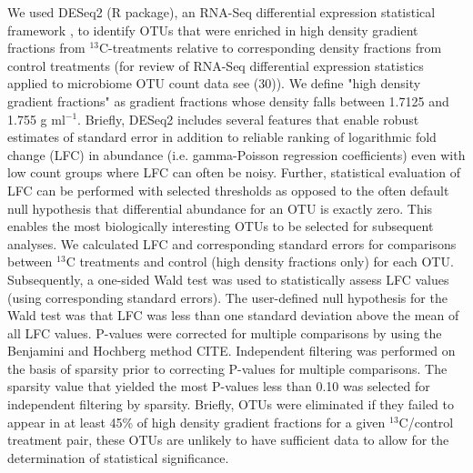 We used DESeq2 (R package), an RNA-Seq differential expression statistical
framework \citep{love2014}, to identify OTUs that were enriched in high
density gradient fractions from $^{13}$C-treatments relative to corresponding
density fractions from control treatments (for review of RNA-Seq differential
expression statistics applied to microbiome OTU count data see (30)). We define
"high density gradient fractions" as gradient fractions whose density falls
between 1.7125 and 1.755 g ml$^{-1}$. Briefly, DESeq2 includes several features that
enable robust estimates of standard error in addition to reliable ranking of
logarithmic fold change (LFC) in abundance (i.e. gamma-Poisson regression
coefficients) even with low count groups where LFC can often be noisy.
Further, statistical evaluation of LFC can be performed with selected
thresholds as opposed to the often default null hypothesis that differential
abundance for an OTU is exactly zero. This enables the most biologically
interesting OTUs to be selected for subsequent analyses. We calculated LFC
and corresponding standard errors for comparisons between $^{13}$C
treatments and control (high density fractions only) for each OTU.
Subsequently, a one-sided Wald test was used to statistically assess LFC
values (using corresponding standard errors). The user-defined null
hypothesis for the Wald test was that LFC was less than one standard
deviation above the mean of all LFC values. P-values were corrected for
multiple comparisons by using the Benjamini and Hochberg method CITE.
Independent filtering was performed on the basis of sparsity prior to
correcting P-values for multiple comparisons. The sparsity value that yielded
the most P-values less than 0.10 was selected for independent filtering by
sparsity. Briefly, OTUs were eliminated if they failed to appear in at least
45\% of high density gradient fractions for a given $^{13}$C/control treatment
pair, these OTUs are unlikely to have sufficient data to allow for the
determination of statistical significance.
